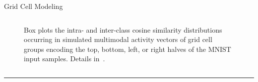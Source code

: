 \begin{frame}{Grid Cell Modeling }
\begin{columns}[t]
\begin{column}{0.35\textwidth}
\begin{figure}
\vspace{-0.5em}
\caption{\justifying\scriptsize Box plots the intra- and inter-class cosine 
similarity distributions occurring in simulated multimodal activity vectors of 
grid cell groups encoding the top, bottom, left, or right halves of the MNIST 
input samples. Details in~\cite{kerdels2017}.}
\end{figure}
\end{column}
\end{columns}	

\vspace{-0.5em}

\begin{center}
\rule{2cm}{0.4pt}\\[0.5em]
\end{center}


\end{frame}

